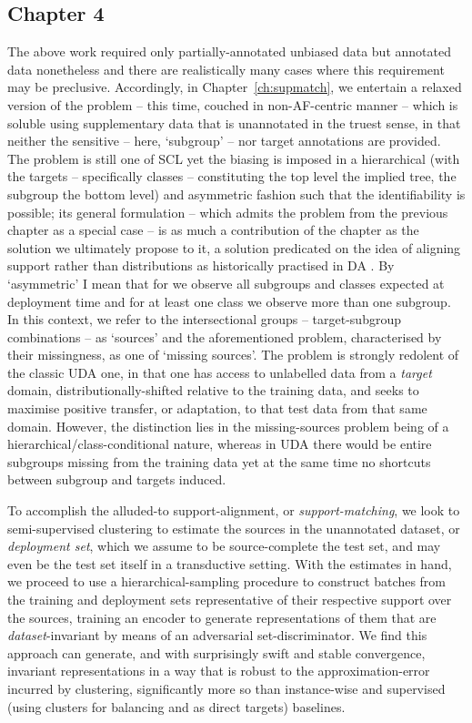 \subsection*{Chapter 4}%
%
The above work required only partially-annotated unbiased data but annotated data nonetheless and
there are realistically many cases where this requirement may be preclusive.
%
Accordingly, in Chapter~\ref{ch:supmatch}, we entertain a relaxed version of the problem -- this
time, couched in non-\ac{AF}-centric manner -- which is soluble using supplementary data that is
unannotated in the truest sense, in that neither the sensitive -- here, `subgroup' -- nor target
annotations are provided.
%
The problem is still one of \ac{SCL} yet the biasing is imposed in a hierarchical (with the targets
-- specifically classes -- constituting the top level the implied tree, the subgroup the bottom
level) and asymmetric fashion such that the identifiability is possible; its general formulation --
which admits the problem from the previous chapter as a special case -- is as much a contribution
of the chapter as the solution we ultimately propose to it, a solution predicated on the idea of
aligning support rather than distributions as historically practised in \acs{DA}
\citep{ben2006analysis}.
%
By `asymmetric' I mean that for we observe all subgroups and classes expected at deployment time
and for at least one class we observe more than one subgroup. 
%
In this context, we refer to the intersectional groups -- target-subgroup combinations -- as
`sources' and the aforementioned problem, characterised by their missingness, as one of `missing
sources'.
%
The problem is strongly redolent of the classic \ac{UDA} one, in that one has access to unlabelled
data from a \emph{target} domain, distributionally-shifted relative to the training data, and seeks
to maximise positive transfer, or adaptation, to that test data from that same domain.
%
However, the distinction lies in the missing-sources problem being of a
hierarchical/class-conditional nature, whereas in \ac{UDA} there would be entire subgroups missing
from the training data yet at the same time no shortcuts between subgroup and targets induced.

%
To accomplish the alluded-to support-alignment, or \emph{support-matching}, we look to
semi-supervised clustering to estimate the sources in the unannotated dataset, or \emph{deployment
set}, which we assume to be source-complete \wrt{} the test set, and may even be the test set
itself in a transductive setting.
%
With the estimates in hand, we proceed to use a hierarchical-sampling procedure to construct
batches from the training and deployment sets representative of their respective support over the
sources, training an encoder to generate representations of them that are \emph{dataset}-invariant
by means of an adversarial set-discriminator.
%
We find this approach can generate, and with surprisingly swift and stable convergence, invariant
representations in a way that is robust to the approximation-error incurred by clustering,
significantly more so than instance-wise and supervised (using clusters for balancing and as direct
targets) baselines.
%

